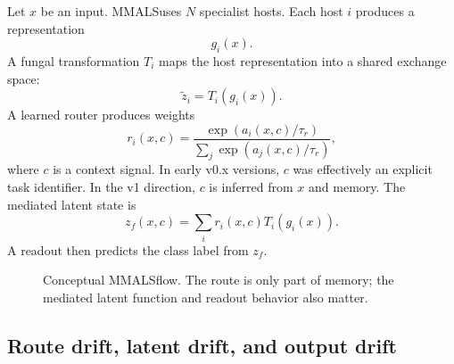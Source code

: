 \documentclass[11pt]{article}
\newcommand{\mmals}{\textsc{MMALS}}
\newcommand{\zf}{z_f}
\begin{document}
Let $x$ be an input. \mmals uses $N$ specialist hosts. Each host $i$ produces a representation
\begin{equation}
  g_i(x).
\end{equation}
A fungal transformation $T_i$ maps the host representation into a shared exchange space:
\begin{equation}
  \tilde{z}_i = T_i(g_i(x)).
\end{equation}
A learned router produces weights
\begin{equation}
  r_i(x,c) = \frac{\exp(a_i(x,c)/\tau_r)}{\sum_j \exp(a_j(x,c)/\tau_r)},
\end{equation}
where $c$ is a context signal. In early v0.x versions, $c$ was effectively an explicit task identifier. In the v1 direction, $c$ is inferred from $x$ and memory. The mediated latent state is
\begin{equation}
  \zf(x,c) = \sum_i r_i(x,c) T_i(g_i(x)).
\end{equation}
A readout then predicts the class label from $\zf$.

\begin{figure}[h]
\centering
{}
\caption{Conceptual \mmals flow. The route is only part of memory; the mediated latent function and readout behavior also matter.}
\end{figure}

\subsection{Route drift, latent drift, and output drift}
\end{document}

